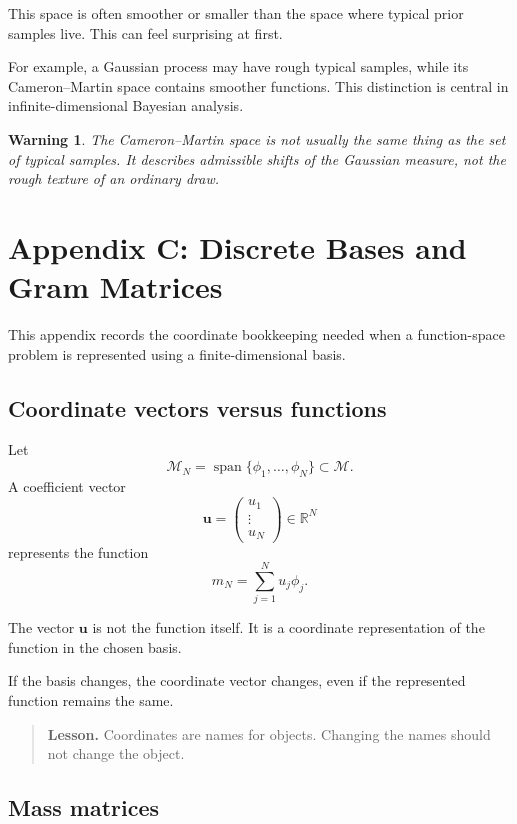 \documentclass[11pt,a4paper]{book}
\newtheorem{warning}[definition]{Warning}
\newenvironment{lesson}
  {\begin{quote}\textbf{Lesson.}}
  {\end{quote}}
\newcommand{\M}{\mathcal{M}}      %
\newcommand{\R}{\mathbb{R}}
\begin{document}
This space is often smoother or smaller than the space where typical prior
samples live. This can feel surprising at first.

For example, a Gaussian process may have rough typical samples, while its
Cameron--Martin space contains smoother functions. This distinction is central
in infinite-dimensional Bayesian analysis.

\begin{warning}
The Cameron--Martin space is not usually the same thing as the set of typical
samples. It describes admissible shifts of the Gaussian measure, not the rough
texture of an ordinary draw.
\end{warning}

\chapter{Appendix C: Discrete Bases and Gram Matrices}

This appendix records the coordinate bookkeeping needed when a function-space
problem is represented using a finite-dimensional basis.

\section{Coordinate vectors versus functions}

Let
\[
    \M_N
    =
    \operatorname{span}\{\phi_1,\ldots,\phi_N\}
    \subset \M.
\]
A coefficient vector
\[
    \bm{u}
    =
    \begin{pmatrix}
        u_1\\
        \vdots\\
        u_N
    \end{pmatrix}
    \in\R^N
\]
represents the function
\[
    m_N
    =
    \sum_{j=1}^N u_j\phi_j.
\]

The vector $\bm{u}$ is not the function itself. It is a coordinate
representation of the function in the chosen basis.

If the basis changes, the coordinate vector changes, even if the represented
function remains the same.

\begin{lesson}
Coordinates are names for objects. Changing the names should not change the
object.
\end{lesson}

\section{Mass matrices}
\end{document}
